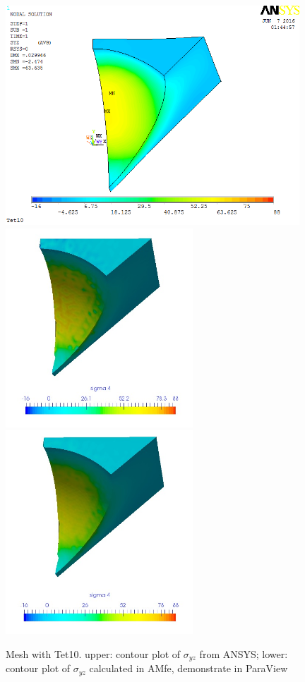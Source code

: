 \begin{figure}[htbp]
	\begin{center}
		\includegraphics[width=11cm,clip]{Tet10_Syz.png} 		
		\includegraphics[width=7cm,clip]{Tet10_Syz_PD.png} 		
		\includegraphics[width=7cm,clip]{Tet10_Syz_P.png} 		
		\caption{Mesh with Tet10. upper: contour plot of $\sigma_{yz}$ from ANSYS; lower: contour plot of $\sigma_{yz}$ calculated in AMfe, demonstrate in ParaView} \label{fig: Tet10_Syz}
	\end{center}
\end{figure}
\clearpage 

